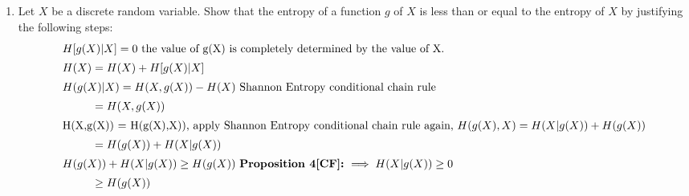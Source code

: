 \documentclass[pdftex,12pt,a4paper]{article}
\begin{document}


\begin{enumerate}
    \item Let $X$ be a discrete random variable.  Show that the entropy of a
        function $g$ of $X$ is less than or equal to the entropy of $X$ by
        justifying the following steps:
        \begin{align}
            \intertext{$H[g(X)|X] = 0$ the value of g(X) is completely determined by the value of X.}
            H(X) &= H(X) + H[g(X)|X]\\
            \intertext{$H(g(X)|X)=H(X,g(X))-H(X)$ Shannon Entropy conditional chain rule}
                 &= H(X,g(X))\\
            \intertext{H(X,g(X)) = H(g(X),X)), apply Shannon Entropy conditional chain rule again, $H(g(X),X)=H(X|g(X))+H(g(X))$}
                 &= H(g(X)) + H(X|g(X))\\
            \intertext{$H(g(X)) + H(X|g(X)) \ge H(g(X))$
                       \textbf{Proposition 4[CF]:} $\implies H(X|g(X)) \ge 0 $}
                 &\ge H(g(X))
        \end{align}


\end{enumerate}
\end{document}

